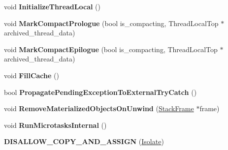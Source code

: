 \begin{DoxyCompactItemize}
\item 
void {\bfseries Initialize\+Thread\+Local} ()\hypertarget{classv8_1_1internal_1_1_isolate_a55d169cdd89dee4c975249bac3edae1d}{}\label{classv8_1_1internal_1_1_isolate_a55d169cdd89dee4c975249bac3edae1d}

\item 
void {\bfseries Mark\+Compact\+Prologue} (bool is\+\_\+compacting, Thread\+Local\+Top $\ast$archived\+\_\+thread\+\_\+data)\hypertarget{classv8_1_1internal_1_1_isolate_a2831ce1346afa920eb49599252e93f56}{}\label{classv8_1_1internal_1_1_isolate_a2831ce1346afa920eb49599252e93f56}

\item 
void {\bfseries Mark\+Compact\+Epilogue} (bool is\+\_\+compacting, Thread\+Local\+Top $\ast$archived\+\_\+thread\+\_\+data)\hypertarget{classv8_1_1internal_1_1_isolate_ab00b2d1a1adc7a8b682042d22d88574e}{}\label{classv8_1_1internal_1_1_isolate_ab00b2d1a1adc7a8b682042d22d88574e}

\item 
void {\bfseries Fill\+Cache} ()\hypertarget{classv8_1_1internal_1_1_isolate_ae4b03267ce535895deed8ee8a6126527}{}\label{classv8_1_1internal_1_1_isolate_ae4b03267ce535895deed8ee8a6126527}

\item 
bool {\bfseries Propagate\+Pending\+Exception\+To\+External\+Try\+Catch} ()\hypertarget{classv8_1_1internal_1_1_isolate_a3991466d5495934547c29b2abce0bd30}{}\label{classv8_1_1internal_1_1_isolate_a3991466d5495934547c29b2abce0bd30}

\item 
void {\bfseries Remove\+Materialized\+Objects\+On\+Unwind} (\hyperlink{classv8_1_1_stack_frame}{Stack\+Frame} $\ast$frame)\hypertarget{classv8_1_1internal_1_1_isolate_aede96ff91399becfd8bfb0e6f2340a62}{}\label{classv8_1_1internal_1_1_isolate_aede96ff91399becfd8bfb0e6f2340a62}

\item 
void {\bfseries Run\+Microtasks\+Internal} ()\hypertarget{classv8_1_1internal_1_1_isolate_a97b5f90faa01e7cab32a9c2070191088}{}\label{classv8_1_1internal_1_1_isolate_a97b5f90faa01e7cab32a9c2070191088}

\item 
{\bfseries D\+I\+S\+A\+L\+L\+O\+W\+\_\+\+C\+O\+P\+Y\+\_\+\+A\+N\+D\+\_\+\+A\+S\+S\+I\+GN} (\hyperlink{classv8_1_1internal_1_1_isolate}{Isolate})\hypertarget{classv8_1_1internal_1_1_isolate_a60cb1da4e44224f8fb7cc7909bcb20e7}{}\label{classv8_1_1internal_1_1_isolate_a60cb1da4e44224f8fb7cc7909bcb20e7}

\end{DoxyCompactItemize}
